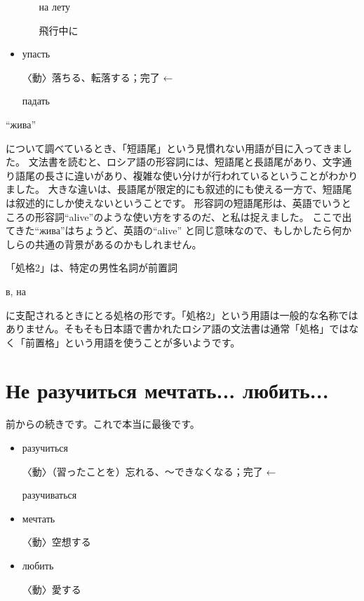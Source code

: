 \documentclass[12pt]{ltjsarticle}
\begin{document}
\begin{itemize}
        \begin{itemize}
            \begin{russian}на лету\end{russian} 飛行中に
        \end{itemize}
    \item \begin{russian}упасть\end{russian}  〈動〉落ちる、転落する；完了 ← \begin{russian}падать\end{russian} 
\end{itemize}

\bigskip

\begin{russian}“жива”\end{russian}について調べているとき、「短語尾」という見慣れない用語が目に入ってきました。
文法書を読むと、ロシア語の形容詞には、短語尾と長語尾があり、文字通り語尾の長さに違いがあり、複雑な使い分けが行われているということがわかりました。
大きな違いは、長語尾が限定的にも叙述的にも使える一方で、短語尾は叙述的にしか使えないということです。
形容詞の短語尾形は、英語でいうところの形容詞“alive”のような使い方をするのだ、と私は捉えました。
ここで出てきた“жива”はちょうど、英語の“alive” と同じ意味なので、もしかしたら何かしらの共通の背景があるのかもしれません。

「処格2」は、特定の男性名詞が前置詞\begin{russian}в, на\end{russian}に支配されるときにとる処格の形です。「処格2」という用語は一般的な名称ではありません。そもそも日本語で書かれたロシア語の文法書は通常「処格」ではなく「前置格」という用語を使うことが多いようです。

\section{Не разучиться мечтать... любить...}

前からの続きです。これで本当に最後です。
\begin{itemize}
    \item \begin{russian}разучиться\end{russian}  〈動〉（習ったことを）忘れる、〜できなくなる；完了 ← \begin{russian}разучиваться\end{russian} 
    \item \begin{russian}мечтать\end{russian}  〈動〉空想する
    \item \begin{russian}любить\end{russian}  〈動〉愛する
\end{itemize}
\end{document}
